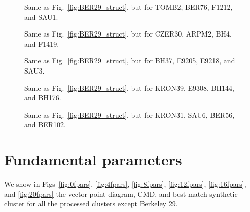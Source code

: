 \documentclass{aa}
\begin{document}
\begin{appendix}
 \begin{figure}
  \caption{Same as Fig.~\ref{fig:BER29_struct}, but  for TOMB2, BER76, F1212, and SAU1.}
  \label{fig:4struct}
 \end{figure}

 \begin{figure}
  \caption{Same as Fig.~\ref{fig:BER29_struct}, but for CZER30, ARPM2, BH4, and F1419.}
  \label{fig:8struct}
 \end{figure}

 \begin{figure}
  \caption{Same as Fig.~\ref{fig:BER29_struct}, but  for BH37, E9205, E9218, and SAU3.}
  \label{fig:12struct}
 \end{figure}

 \begin{figure}
  \caption{Same as Fig.~\ref{fig:BER29_struct}, but  for KRON39, E9308, BH144, and BH176.}
  \label{fig:16struct}
 \end{figure}

 \begin{figure}
  \caption{Same as Fig.~\ref{fig:BER29_struct}, but  for KRON31, SAU6, BER56, and BER102.}
  \label{fig:20struct}
 \end{figure}


\FloatBarrier
\section{Fundamental parameters}
 \label{app:fundam_params}

 We show in Figs~\ref{fig:0fpars}, \ref{fig:4fpars}, \ref{fig:8fpars},
 \ref{fig:12fpars}, \ref{fig:16fpars}, and \ref{fig:20fpars} the vector-point
 diagram, CMD, and best match synthetic cluster for all the processed clusters
 except Berkeley 29.


\end{appendix}
\end{document}
